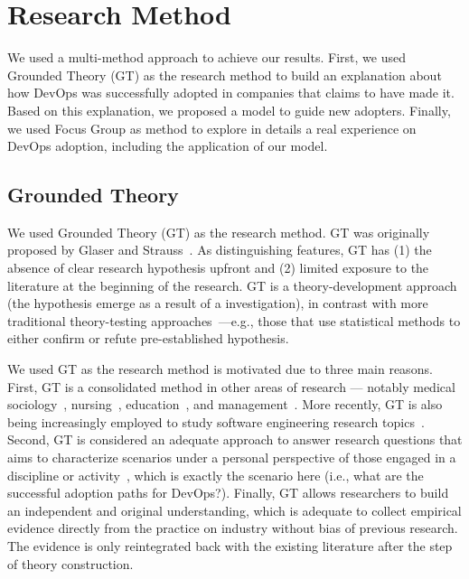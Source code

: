 \section{Research Method} \label{sec:research_method}

{
\color{blue}
We used a multi-method approach to achieve our results. First, we used Grounded
Theory (GT) as the research method to build an explanation about how DevOps was
successfully adopted in companies that claims to have made it. Based on this
explanation, we proposed a model to guide new adopters. Finally, we used
Focus Group as method to explore in details a real experience on DevOps adoption,
including the application of our model.
}

\subsection{Grounded Theory}

We used Grounded Theory (GT) as the research method. GT was
originally proposed by Glaser and Strauss~\cite{glase1967discovery}.
As distinguishing features, GT has (1) the absence of clear research hypothesis upfront
and (2) limited exposure to the literature at the beginning of the research. GT
is a theory-development approach (the hypothesis emerge as a result of
a investigation), in contrast with more traditional
theory-testing approaches~\cite{coleman2007using}---e.g., those that
use statistical methods to either confirm or refute pre-established hypothesis.

We used GT as the research method is motivated due to three main reasons. First, GT is a consolidated
method in other areas of research --- notably medical
sociology~\cite{gt_medical_sociology}, nursing~\cite{barnsteiner2002using}, education~\cite{gt_education},
and management~\cite{gt_management}. More recently, GT is also being increasingly employed
to study software engineering research topics~\cite{hoda2017becoming,stol2016grounded,adolph2011using}. Second,
GT is considered an adequate approach to answer research questions that aims to
characterize scenarios under a personal perspective of those
engaged in a discipline or activity~\cite{barnsteiner2002using},
which is exactly the scenario here (i.e., what are the successful adoption paths for DevOps?). Finally,
GT allows researchers to build an independent and original understanding,
which is adequate to collect empirical evidence directly from the
practice on industry without bias of previous research. The evidence
is only reintegrated back with the existing literature after the step of
theory construction.

